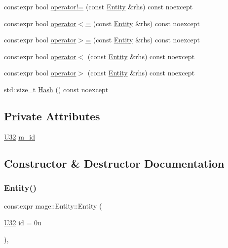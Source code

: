 \begin{DoxyCompactItemize}
\item 
constexpr bool \mbox{\hyperlink{classmage_1_1_entity_ac18c76ad9c3f5e42ada9451e1b83f7cd}{operator!=}} (const \mbox{\hyperlink{classmage_1_1_entity}{Entity}} \&rhs) const noexcept
\item 
constexpr bool \mbox{\hyperlink{classmage_1_1_entity_a01b27c58e6ee9241dfcecfe65c6958c4}{operator$<$=}} (const \mbox{\hyperlink{classmage_1_1_entity}{Entity}} \&rhs) const noexcept
\item 
constexpr bool \mbox{\hyperlink{classmage_1_1_entity_a6e7e96380255e53230ad1d180c6fc37a}{operator$>$=}} (const \mbox{\hyperlink{classmage_1_1_entity}{Entity}} \&rhs) const noexcept
\item 
constexpr bool \mbox{\hyperlink{classmage_1_1_entity_a89fb7b21e5e82dce72f68aed4f1b1233}{operator$<$}} (const \mbox{\hyperlink{classmage_1_1_entity}{Entity}} \&rhs) const noexcept
\item 
constexpr bool \mbox{\hyperlink{classmage_1_1_entity_a1c37b19e65cef365024d56224c553a60}{operator$>$}} (const \mbox{\hyperlink{classmage_1_1_entity}{Entity}} \&rhs) const noexcept
\item 
std\+::size\+\_\+t \mbox{\hyperlink{classmage_1_1_entity_a3a3c4da60750874d5db240dbd15ff81d}{Hash}} () const noexcept
\end{DoxyCompactItemize}
\subsection*{Private Attributes}
\begin{DoxyCompactItemize}
\item 
\mbox{\hyperlink{namespacemage_aa5d6eaabaac3cdd01873d6a3d27e90f3}{U32}} \mbox{\hyperlink{classmage_1_1_entity_a7e312e01da6d5d1e3ba7e18765bde9bc}{m\+\_\+id}}
\end{DoxyCompactItemize}


\subsection{Constructor \& Destructor Documentation}
\mbox{\label{classmage_1_1_entity_a52d3874de76f7397f40d7c6c435a634e}} 
\subsubsection{\texorpdfstring{Entity()}{Entity()}\hspace{0.1cm}{\footnotesize\ttfamily [1/3]}}
{\footnotesize\ttfamily constexpr mage\+::\+Entity\+::\+Entity (\begin{DoxyParamCaption}\item[{\mbox{\hyperlink{namespacemage_aa5d6eaabaac3cdd01873d6a3d27e90f3}{U32}}}]{id = {\ttfamily 0u} }\end{DoxyParamCaption})\hspace{0.3cm}{\ttfamily [explicit]}, {\ttfamily [noexcept]}}

